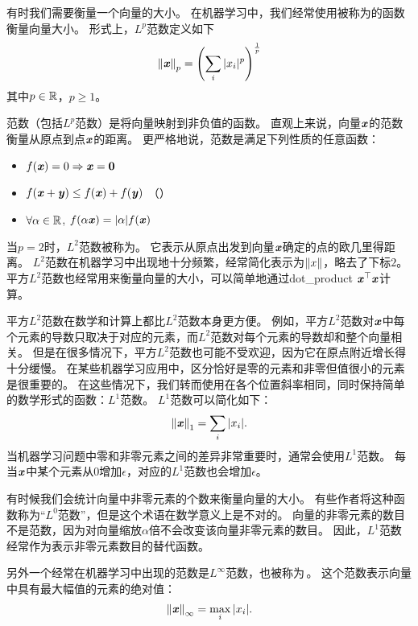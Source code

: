 有时我们需要衡量一个向量的大小。
在机器学习中，我们经常使用被称为的函数衡量向量大小。
形式上，$L^p$范数定义如下
\begin{equation}
    \left\lVert\boldsymbol{\mathit{x}}\right\rVert_p = \left( \sum_i |x_i|^p \right)^{\frac{1}{p}}
\label{eq:2.30}
\end{equation}
其中$p\in \mathbb{R}$，$p\geq 1$。





范数（包括$L^p$范数）是将向量映射到非负值的函数。
直观上来说，向量$\boldsymbol{\mathit{x}}$的范数衡量从原点到点$\boldsymbol{\mathit{x}}$的距离。
更严格地说，范数是满足下列性质的任意函数：
\begin{itemize}
\item $f(\boldsymbol{\mathit{x}}) = 0 \Rightarrow \boldsymbol{\mathit{x}} = \mathbf{0}$ 
\item $f(\boldsymbol{\mathit{x}} + \boldsymbol{\mathit{y}}) \leq f(\boldsymbol{\mathit{x}}) + f(\boldsymbol{\mathit{y}})$ （）
\item $\forall \alpha \in \mathbb{R}$, $f(\alpha \boldsymbol{\mathit{x}}) = |\alpha| f(\boldsymbol{\mathit{x}})$
\end{itemize}


当$p=2$时，$L^2$范数被称为。
它表示从原点出发到向量$\boldsymbol{\mathit{x}}$确定的点的欧几里得距离。
$L^2$范数在机器学习中出现地十分频繁，经常简化表示为$\left\lVert x\right\rVert$，略去了下标$2$。
平方$L^2$范数也经常用来衡量向量的大小，可以简单地通过\gls{dot_product} $\boldsymbol{\mathit{x}}^\top\boldsymbol{\mathit{x}}$计算。


平方$L^2$范数在数学和计算上都比$L^2$范数本身更方便。
例如，平方$L^2$范数对$\boldsymbol{\mathit{x}}$中每个元素的导数只取决于对应的元素，而$L^2$范数对每个元素的导数却和整个向量相关。
但是在很多情况下，平方$L^2$范数也可能不受欢迎，因为它在原点附近增长得十分缓慢。
在某些机器学习应用中，区分恰好是零的元素和非零但值很小的元素是很重要的。
在这些情况下，我们转而使用在各个位置斜率相同，同时保持简单的数学形式的函数：$L^1$范数。
$L^1$范数可以简化如下：
\begin{equation}
    \left\lVert\boldsymbol{\mathit{x}}\right\rVert_1 = \sum_i  |x_i|.
\end{equation}
当机器学习问题中零和非零元素之间的差异非常重要时，通常会使用$L^1$范数。
每当$\boldsymbol{\mathit{x}}$中某个元素从$0$增加$\epsilon$，对应的$L^1$范数也会增加$\epsilon$。


有时候我们会统计向量中非零元素的个数来衡量向量的大小。
有些作者将这种函数称为``$L^0$范数''，但是这个术语在数学意义上是不对的。
向量的非零元素的数目不是范数，因为对向量缩放$\alpha$倍不会改变该向量非零元素的数目。
因此，$L^1$范数经常作为表示非零元素数目的替代函数。





另外一个经常在机器学习中出现的范数是$L^\infty$范数，也被称为\,。
这个范数表示向量中具有最大幅值的元素的绝对值：
\begin{equation}
    \left\lVert\boldsymbol{\mathit{x}}\right\rVert_\infty = \max_i |x_i|.
\end{equation}


